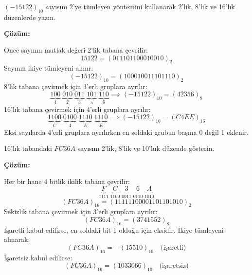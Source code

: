 \begin{ornek}[A.16]
$(-15122)_{10}$ sayısını 2'ye tümleyen yöntemini kullanarak 2'lik, 8'lik ve 16'lık düzenlerde yazın.

\textbf{Çözüm:}

Önce sayının mutlak değeri 2'lik tabana çevrilir:
\[
15122 = (011101100010010)_2
\]
Sayının ikiye tümleyeni alınır:
\[
(-15122)_{10} = (100010011101110)_2
\]
8'lik tabana çevirmek için 3'erli gruplara ayrılır:
\[
\underbrace{100}_{4}\;\underbrace{010}_{2}\;\underbrace{011}_{3}\;\underbrace{101}_{5}\;\underbrace{110}_{6} \implies (-15122)_{10} = (42356)_8
\]
16'lık tabana çevirmek için 4'erli gruplara ayrılır:
\[
\underbrace{1100}_{C}\;\underbrace{0100}_{4}\;\underbrace{1110}_{E}\;\underbrace{1110}_{E} \implies (-15122)_{10} = (C4EE)_{16}
\]
Eksi sayılarda 4'erli gruplara ayrılırken en soldaki grubun başına 0 değil 1 eklenir.
\end{ornek}

\begin{ornek}[A.17]
16'lık tabandaki $FC36A$ sayısını 2'lik, 8'lik ve 10'luk düzende gösterin.

\textbf{Çözüm:}

Her bir hane 4 bitlik ikilik tabana çevrilir:
\[
\underbrace{F}_{1111}\;\underbrace{C}_{1100}\;\underbrace{3}_{0011}\;\underbrace{6}_{0110}\;\underbrace{A}_{1010}
\]
\[
(FC36A)_{16} = (11111100001101101010)_2
\]
Sekizlik tabana çevirmek için 3'erli gruplara ayrılır:
\[
(FC36A)_{16} = (3741552)_8
\]
İşaretli kabul edilirse, en soldaki bit 1 olduğu için eksidir. İkiye tümleyeni alınarak:
\[
(FC36A)_{16} = -(15510)_{10} \quad \text{(işaretli)}
\]
İşaretsiz kabul edilirse:
\[
(FC36A)_{16} = (1033066)_{10} \quad \text{(işaretsiz)}
\]
\end{ornek}

